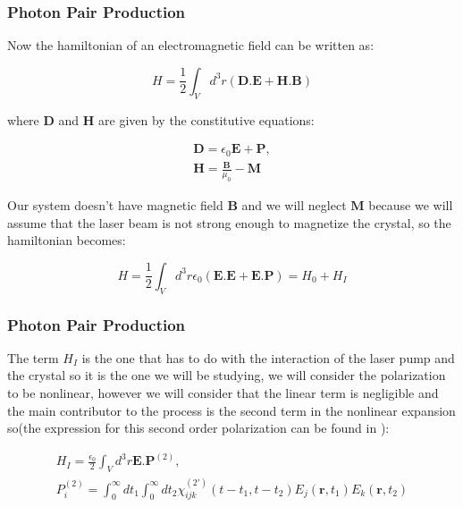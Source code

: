 \documentclass[]{beamer}
\begin{document}
  \begin{frame}
    \frametitle{Photon Pair Production}
Now the hamiltonian of an electromagnetic field can be written as:

\begin{equation}
H=\frac{1}{2}\int_{V} d^{3}r (\textbf{D.E}+\textbf{H.B})
\end{equation}

where $\textbf{D}$ and $\textbf{H}$ are given by the constitutive equations:

\begin{align}
\textbf{D}= \epsilon_{0} \textbf{E}+\textbf{P},\\
\textbf{H}=\frac{\textbf{B}}{\mu_{0}}-\textbf{M}
\end{align}

Our system doesn't have magnetic field $\textbf{B}$ and we will neglect $\textbf{M}$ because we will assume that the laser beam is not strong enough to magnetize the crystal, so the hamiltonian becomes:

\begin{equation}
H=\frac{1}{2}\int_{V} d^{3}r \epsilon_{0}(\textbf{E.E}+\textbf{E.P})=H_{0}+H_{I}
\end{equation}



  \end{frame}

\begin{frame}
\frametitle{Photon Pair Production}
The term $H_{I}$ is the one that has to do with the interaction of the laser pump and the crystal so  it is the one we will be studying, we will consider the polarization to be nonlinear, however we will consider that the linear term is negligible and the main contributor to the process is the second term in the nonlinear expansion so(the expression for this second order polarization can be found in \cite{boyd}):


\begin{align}
H_{I}=\frac{\epsilon_{0}}{2} \int_{V} d^{3}r \textbf{E}.\textbf{P}^{(2)},\\
P_{i}^{(2)}=\int_{0}^{\infty}dt_{1}\int_{0}^{\infty}dt_{2} \chi_{ijk}^{(2')}(t-t_{1},t-t_{2}) E_{j}(\textbf{r},t_{1}) E_{k}(\textbf{r},t_{2})
\end{align}
\end{frame}
\end{document}
